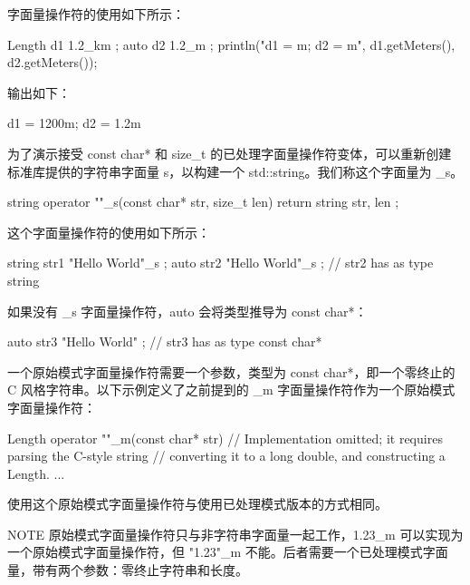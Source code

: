 字面量操作符的使用如下所示：

\begin{cpp}
Length d1 { 1.2_km };
auto d2 { 1.2_m };
println("d1 = {}m; d2 = {}m", d1.getMeters(), d2.getMeters());
\end{cpp}

输出如下：

\begin{shell}
d1 = 1200m; d2 = 1.2m
\end{shell}

为了演示接受 const char* 和 size\_t 的已处理字面量操作符变体，可以重新创建标准库提供的字符串字面量 s，以构建一个 std::string。我们称这个字面量为 \_s。

\begin{cpp}
string operator ""_s(const char* str, size_t len)
{
    return string { str, len };
}
\end{cpp}

这个字面量操作符的使用如下所示：

\begin{cpp}
string str1 { "Hello World"_s };
auto str2 { "Hello World"_s }; // str2 has as type string
\end{cpp}

如果没有 \_s 字面量操作符，auto 会将类型推导为 const char*：

\begin{cpp}
auto str3 { "Hello World" }; // str3 has as type const char*
\end{cpp}



一个原始模式字面量操作符需要一个参数，类型为 const char*，即一个零终止的 C 风格字符串。以下示例定义了之前提到的 \_m 字面量操作符作为一个原始模式字面量操作符：

\begin{cpp}
Length operator ""_m(const char* str)
{
    // Implementation omitted; it requires parsing the C-style string
    // converting it to a long double, and constructing a Length.
    ...
}
\end{cpp}

使用这个原始模式字面量操作符与使用已处理模式版本的方式相同。

\begin{myNotic}{NOTE}
原始模式字面量操作符只与非字符串字面量一起工作，1.23\_m 可以实现为一个原始模式字面量操作符，但 "1.23"\_m 不能。后者需要一个已处理模式字面量，带有两个参数：零终止字符串和长度。
\end{myNotic}















